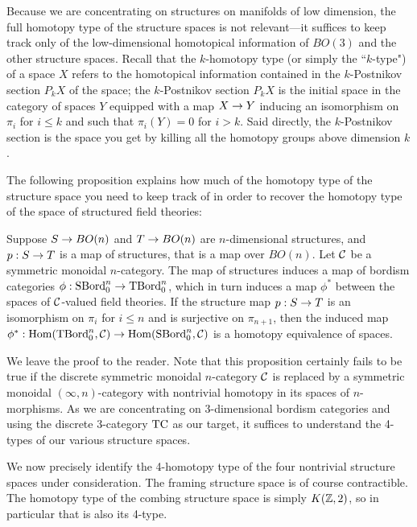 \documentclass{amsart}
\begin{document}
Because we are concentrating on structures on manifolds of low dimension, the full homotopy type of the structure spaces is not relevant---it suffices to keep track only of the low-dimensional homotopical information of $BO(3)$ and the other structure spaces.  Recall that the $k$-homotopy type (or simply the ``$k$-type") of a space $X$ refers to the homotopical information contained in the $k$-Postnikov section $P_k X$ of the space; the $k$-Postnikov section $P_k X$ is the initial space in the category of spaces $Y$ equipped with a map $X \rightarrow Y$ inducing an isomorphism on $\pi_i$ for $i \leq k$ and such that $\pi_i(Y) = 0$ for $i > k$.   Said directly, the $k$-Postnikov section is the space you get by killing all the homotopy groups above dimension $k$.

The following proposition explains how much of the homotopy type of the structure space you need to keep track of in order to recover the homotopy type of the space of structured field theories:
\begin{proposition}
Suppose $S \rightarrow BO(n)$ and $T \rightarrow BO(n)$ are $n$-dimensional structures, and $p: S \rightarrow T$ is a map of structures, that is a map over $BO(n)$.  Let $\mathcal C$ be a symmetric monoidal $n$-category.  The map of structures induces a map of bordism categories $\phi: \mathrm{SBord}_0^n \rightarrow \mathrm{TBord}_0^n$, which in turn induces a map $\phi^*$ between the spaces of $\mathcal C$-valued field theories.  If the structure map $p: S \rightarrow T$ is an isomorphism on $\pi_i$ for $i \leq n$ and is surjective on $\pi_{n+1}$, then the induced map $\phi^*: \operatorname{Hom}(\mathrm{TBord}_0^n,\mathcal C) \rightarrow \operatorname{Hom}(\mathrm{SBord}_0^n,\mathcal C)$ is a homotopy equivalence of spaces.
\end{proposition}

\nid We leave the proof to the reader.  Note that this proposition certainly fails to be true if the discrete symmetric monoidal $n$-category $\mathcal C$ is replaced by a symmetric monoidal $(\infty,n)$-category with nontrivial homotopy in its spaces of $n$-morphisms.  As we are concentrating on 3-dimensional bordism categories and using the discrete 3-category $\mathrm{TC}$ as our target, it suffices to understand the 4-types of our various structure spaces.

We now precisely identify the 4-homotopy type of the four nontrivial structure spaces under consideration.  The framing structure space is of course contractible.  The homotopy type of the combing structure space is simply $K(\mathbb Z,2)$, so in particular that is also its 4-type.
\end{document}
